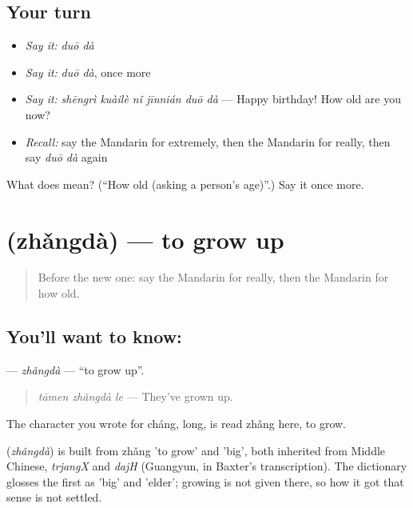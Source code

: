 \subsection*{Your turn}
\begin{itemize}
\raggedright
  \item \emph{Say it:} \emph{duō dà}
  \item \emph{Say it:} \emph{duō dà}, once more
  \item \emph{Say it:} \emph{shēngrì kuàilè nǐ jīnnián duō dà} — Happy birthday! How old are you now?
  \item \emph{Recall:} say the Mandarin for extremely, then the Mandarin for really, then say \emph{duō dà} again
\end{itemize}

\begin{tcolorbox}[breakable,colback=teal!4,colframe=teal!35!black,title={Before you move on}]
What does  mean? (\textquotedblleft{}How old (asking a person's age)\textquotedblright{}.) Say it once more.
\end{tcolorbox}
\section[\texorpdfstring{\zh{长大} (zhǎngdà)}{长大 (zhǎngdà)}]{ (zhǎngdà) — to grow up}

\label{lesson:ZH-C78-zhangda}



\begin{quote}
Before the new one: say the Mandarin for really, then the Mandarin for how old.
\end{quote}

\subsection*{You'll want to know: }
\textbf{} — \emph{zhǎngdà} — \textquotedblleft{}to grow up\textquotedblright{}.

\begin{quote}
\textbf{} \emph{tāmen zhǎngdà le} — They've grown up.
\end{quote}

The character you wrote for cháng, long, is read zhǎng here, to grow.

\begin{cousinweb}
\textbf{} (\emph{zhǎngdà}) is built from zhǎng 'to grow' and  'big', both inherited from Middle Chinese, \emph{trjangX} and \emph{dajH} (Guangyun, in Baxter's transcription). The dictionary glosses the first as 'big' and 'elder'; growing is not given there, so how it got that sense is not settled.
\end{cousinweb}

